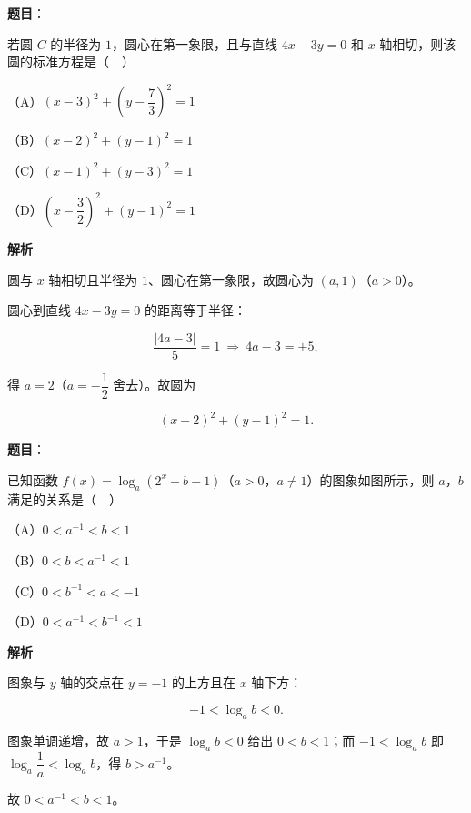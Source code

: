 \begin{answer}

\textbf{题目}：

若圆 $C$ 的半径为 $1$，圆心在第一象限，且与直线 $4x-3y=0$ 和 $x$ 轴相切，则该圆的标准方程是（　）

（A）$(x-3)^2+\left(y-\dfrac73\right)^2=1$

（B）$(x-2)^2+(y-1)^2=1$

（C）$(x-1)^2+(y-3)^2=1$

（D）$\left(x-\dfrac32\right)^2+(y-1)^2=1$

\textbf{解析}

圆与 $x$ 轴相切且半径为 $1$、圆心在第一象限，故圆心为 $(a,1)$（$a>0$）。

圆心到直线 $4x-3y=0$ 的距离等于半径：

\nopagebreak[4]
\[\frac{|4a-3|}5=1\ \Longrightarrow\ 4a-3=\pm5,\]

得 $a=2$（$a=-\dfrac12$ 舍去）。故圆为

\nopagebreak[4]
\[(x-2)^2+(y-1)^2=1.\]


\end{answer}
\begin{answer}

\textbf{题目}：

已知函数 $f(x)=\log_a(2^x+b-1)$（$a>0$，$a\neq1$）的图象如图所示，则 $a$，$b$ 满足的关系是（　）
\nopagebreak[4]
\begin{center}\end{center}
\nopagebreak[4]
（A）$0<a^{-1}<b<1$

（B）$0<b<a^{-1}<1$

（C）$0<b^{-1}<a<-1$

（D）$0<a^{-1}<b^{-1}<1$

\textbf{解析}

图象与 $y$ 轴的交点在 $y=-1$ 的上方且在 $x$ 轴下方：

\nopagebreak[4]
\[-1<\log_ab<0.\]

图象单调递增，故 $a>1$，于是 $\log_ab<0$ 给出 $0<b<1$；而 $-1<\log_ab$ 即 $\log_a\dfrac1a<\log_ab$，得 $b>a^{-1}$。

故 $0<a^{-1}<b<1$。


\end{answer}
